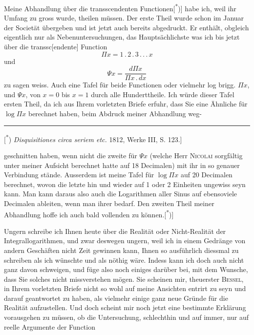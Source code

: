\quad Meine Abhandlung über die transscendenten Functionen[\textsuperscript{*})] habe ich, weil ihr Umfang zu gross wurde, theilen müssen. Der erste Theil wurde schon im Januar der Societät übergeben und ist jetzt auch bereits abgedruckt. Er enthält, obgleich eigentlich nur als Nebenuntersuchungen, das Hauptsächlichste was ich bis jetzt über die transsc[endente] Function
\[
\Pi x=1\,{.}\,2\,{.}\,3\,{.}\,{.}\,{.}\,x
\]
\noindent und
\[
\Psi x=\frac{d\Pi x}{\Pi x\,{.}\,dx}
\]
\noindent zu sagen weiss. Auch eine Tafel für beide Functionen oder vielmehr log brigg. $\Pi x$, und $\Psi x$, von $x=0$ bis $x=1$ durch alle Hunderttheile. Ich würde dieser Tafel ersten Theil, da ich aus Ihrem vorletzten Briefe erfuhr, dass Sie eine Ähnliche für $\log\Pi x$ berechnet haben, beim Abdruck meiner Abhandlung weg-
\par\medskip\noindent\rule{.24\linewidth}{.4pt}\par\smallskip
{\small
\noindent\hspace*{\parindent}[\textsuperscript{*}) \textit{Disquisitiones circa seriem etc.} 1812, Werke III, S. 123.]
\par}
\clearpage{}
\noindent geschnitten haben, wenn nicht die zweite für $\Psi x$ (welche Herr \textsc{Nicolai} sorgfältig unter meiner Aufsicht berechnet hatte auf 18 Decimalen) mit ihr in so genauer Verbindung stände. Ausserdem ist meine Tafel für $\log\Pi x$ auf 20 Decimalen berechnet, wovon die letzte hin und wieder auf 1 oder 2 Einheiten ungewiss seyn kann. Man kann daraus also auch die Logarithmen aller Sinus auf ebensoviele Decimalen ableiten, wenn man ihrer bedarf. Den zweiten Theil meiner Abhandlung hoffe ich auch bald vollenden zu können.[\textsuperscript{*})]
\par{}
\par\indent Ungern schreibe ich Ihnen heute über die Realität oder Nicht-Realität der Integrallogarithmen, und zwar deswegen ungern, weil ich in einem Gedränge von andern Geschäften nicht Zeit gewinnen kann, Ihnen so ausführlich diessmal zu schreiben als ich wünschte und als nöthig wäre. Indess kann ich doch auch nicht ganz davon schweigen, und füge also noch einiges darüber bei, mit dem Wunsche, dass Sie solches nicht missverstehen mögen. Sie scheinen mir, theuerster \textsc{Bessel}, in Ihrem vorletzten Briefe nicht so wohl auf meine Ansichten entrirt zu seyn und darauf geantwortet zu haben, als vielmehr einige ganz neue Gründe für die Realität aufzustellen. Und doch scheint mir noch jetzt eine bestimmte Erklärung vorausgehen zu müssen, ob die Untersuchung, schlechthin und auf immer, nur auf reelle Argumente der Function
